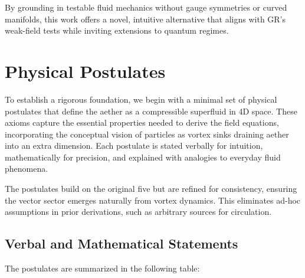 \documentclass{article}
\begin{document}
By grounding in testable fluid mechanics without gauge symmetries or curved manifolds, this work offers a novel, intuitive alternative that aligns with GR's weak-field tests while inviting extensions to quantum regimes.

\section{Physical Postulates}

To establish a rigorous foundation, we begin with a minimal set of physical postulates that define the aether as a compressible superfluid in 4D space. These axioms capture the essential properties needed to derive the field equations, incorporating the conceptual vision of particles as vortex sinks draining aether into an extra dimension. Each postulate is stated verbally for intuition, mathematically for precision, and explained with analogies to everyday fluid phenomena.

The postulates build on the original five but are refined for consistency, ensuring the vector sector emerges naturally from vortex dynamics. This eliminates ad-hoc assumptions in prior derivations, such as arbitrary sources for circulation.

\subsection{Verbal and Mathematical Statements}

The postulates are summarized in the following table:
\end{document}
